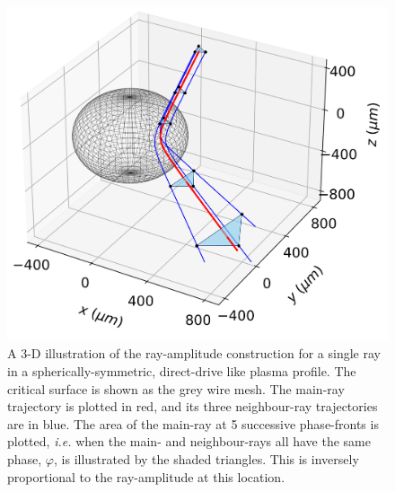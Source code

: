 \begin{figure}[t!]
    \includegraphics[width=0.75\linewidth]{Numerics/Images/3d_raytube.png}
    \centering
    \caption{A 3-D illustration of the ray-amplitude construction for a single ray in a spherically-symmetric, direct-drive like plasma profile.
    The critical surface is shown as the grey wire mesh.
    The main-ray trajectory is plotted in red, and its three neighbour-ray trajectories are in blue.
    The area of the main-ray at 5 successive phase-fronts is plotted, \textit{i.e.} when the main- and neighbour-rays all have the same phase, $\varphi$, is illustrated by the shaded triangles.
    This is inversely proportional to the ray-amplitude at this location.}%
    \label{fig:SOLAS_3draytube}
\end{figure}

